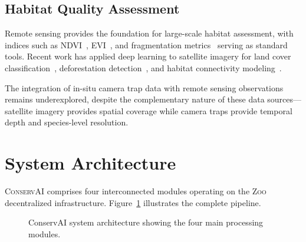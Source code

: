 \documentclass[11pt,letterpaper]{article}
\newcommand{\Zoo}{\textsc{Zoo}}
\newcommand{\ConservAI}{\textsc{ConservAI}}
\begin{document}
\subsection{Habitat Quality Assessment}

Remote sensing provides the foundation for large-scale habitat assessment, with indices such as NDVI~\cite{tucker1979}, EVI~\cite{huete2002}, and fragmentation metrics~\cite{mcgarigal2012} serving as standard tools. Recent work has applied deep learning to satellite imagery for land cover classification~\cite{helber2019}, deforestation detection~\cite{ortega2021}, and habitat connectivity modeling~\cite{mcrae2008}.

The integration of in-situ camera trap data with remote sensing observations remains underexplored, despite the complementary nature of these data sources---satellite imagery provides spatial coverage while camera traps provide temporal depth and species-level resolution.

\section{System Architecture}

\ConservAI{} comprises four interconnected modules operating on the \Zoo{} decentralized infrastructure. Figure~\ref{fig:architecture} illustrates the complete pipeline.

\begin{figure}[htbp]
\centering
{}
\caption{ConservAI system architecture showing the four main processing modules.}
\label{fig:architecture}
\end{figure}
\end{document}
